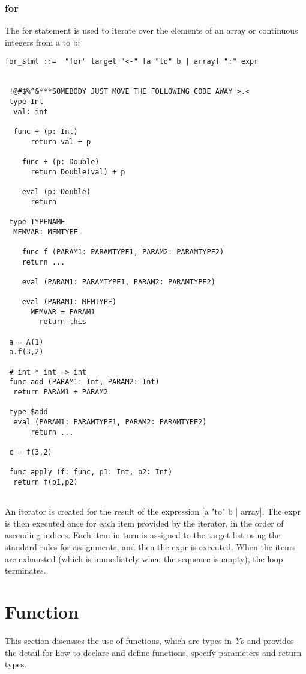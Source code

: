 \documentclass[12pt]{article}
\begin{document}
\subsubsection{for} %
The for statement is used to iterate over the elements of an array or continuous integers from a to b:
\begin{lstlisting}[caption=for]
 for_stmt ::=  "for" target "<-" [a "to" b | array] ":" expr
 
 
 !@#$%^&***SOMEBODY JUST MOVE THE FOLLOWING CODE AWAY >.<
 type Int
  val: int
    
  func + (p: Int)
      return val + p
    
    func + (p: Double)
      return Double(val) + p
        
    eval (p: Double)
      return 
 
 type TYPENAME
  MEMVAR: MEMTYPE
    
    func f (PARAM1: PARAMTYPE1, PARAM2: PARAMTYPE2)
    return ...
    
    eval (PARAM1: PARAMTYPE1, PARAM2: PARAMTYPE2)
    
    eval (PARAM1: MEMTYPE)
      MEMVAR = PARAM1
        return this
    
 a = A(1)
 a.f(3,2)
    
 # int * int => int
 func add (PARAM1: Int, PARAM2: Int)
  return PARAM1 + PARAM2
    
 type $add
  eval (PARAM1: PARAMTYPE1, PARAM2: PARAMTYPE2)
      return ...
        
 c = f(3,2)
 
 func apply (f: func, p1: Int, p2: Int)
  return f(p1,p2)
 
\end{lstlisting}
An iterator is created for the result of the expression [a "to" b | array]. The expr is then executed once for each item provided by the iterator, in the order of ascending indices. Each item in turn is assigned to the target list using the standard rules for assignments, and then the expr is executed. When the items are exhausted (which is immediately when the sequence is empty), the loop terminates.

\section{Function} %
\label{sec:function}
This section discusses the use of functions, which are types in \textit{Yo} and provides the detail for how to declare and define functions, specify parameters and return types. 
\end{document}
